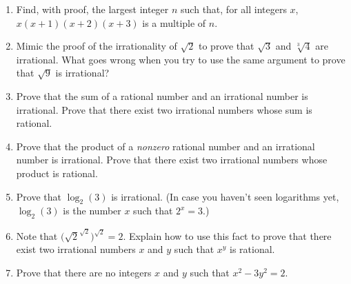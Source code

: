 \documentclass[12pt]{article}
\begin{document}
\begin{enumerate}
  \item Find, with proof, the largest integer $n$ such that, for all integers $x$, 
  $x(x+1)(x+2)(x+3)$ is a multiple of $n$.

  \item Mimic the proof of the irrationality of $\sqrt{2}$ to prove that $\sqrt{3}$ 
  and $\sqrt[3]{4}$ are irrational. What goes wrong when you try to use the same 
  argument to prove that $\sqrt{9}$ is irrational?

  \item Prove that the sum of a rational number and an irrational number is irrational. 
  Prove that there exist two irrational numbers whose sum is rational.

  \item Prove that the product of a \textit{nonzero} rational number and an 
  irrational number is irrational. Prove that there exist two irrational numbers 
  whose product is rational.

  \item Prove that $\log_2(3)$ is irrational. (In case you haven't seen logarithms yet, 
  $\log_2(3)$ is the number $x$ such that $2^x = 3$.)

  \item Note that $\big(\sqrt{2}^{\sqrt{2}}\big)^{\sqrt{2}} = 2$. 
  Explain how to use this fact to prove that there exist two irrational numbers $x$ and $y$ 
  such that $x^y$ is rational.

  \item Prove that there are no integers $x$ and $y$ such that $x^2 - 3y^2 = 2$.
\end{enumerate}
\end{document}
